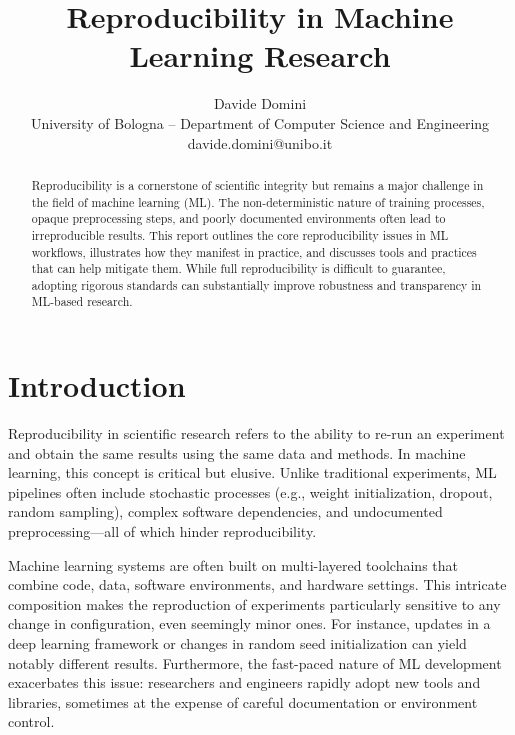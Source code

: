 \documentclass[11pt]{article}
\begin{document}
%
\title{Reproducibility in Machine Learning Research}
\author{Davide Domini \\
University of Bologna -- Department of Computer Science and Engineering\\
davide.domini@unibo.it
}
\maketitle



\begin{abstract}
Reproducibility is a cornerstone of scientific integrity but remains a major challenge 
 in the field of machine learning (ML). 
%
The non-deterministic nature of training processes, opaque preprocessing steps, 
 and poorly documented environments often lead to irreproducible results. 
%
This report outlines the core reproducibility issues in ML workflows, 
 illustrates how they manifest in practice, and discusses tools 
 and practices that can help mitigate them. 
% 
While full reproducibility is difficult to guarantee, adopting rigorous standards 
 can substantially improve robustness and transparency in ML-based research.
\end{abstract}

\section{Introduction}
\label{sec:introduction}
Reproducibility in scientific research refers to the ability to re-run an experiment and 
 obtain the same results using the same data and methods. 
%
In machine learning, this concept is critical but elusive. 
%
Unlike traditional experiments, ML pipelines often include stochastic processes 
 (e.g., weight initialization, dropout, random sampling), complex software dependencies, 
 and undocumented preprocessing---all of which hinder reproducibility.

Machine learning systems are often built on multi-layered toolchains that combine 
 code, data, software environments, and hardware settings. 
% 
This intricate composition makes the reproduction of experiments particularly sensitive to 
 any change in configuration, even seemingly minor ones. 
% 
For instance, updates in a deep learning framework or changes in random seed initialization 
 can yield notably different results. 
% 
Furthermore, the fast-paced nature of ML development exacerbates this issue: 
 researchers and engineers rapidly adopt new tools and libraries, 
 sometimes at the expense of careful documentation or environment control.
\end{document}
